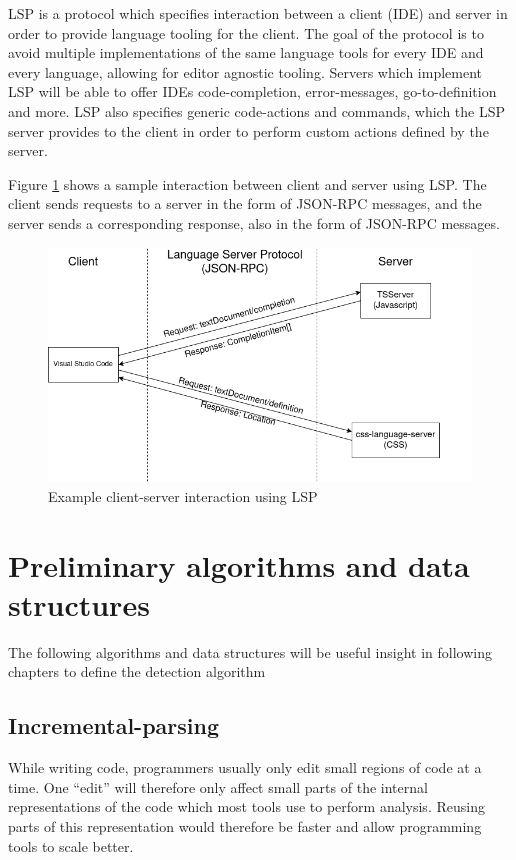 LSP is a protocol which specifies interaction between a client (IDE) and server in order
to provide language tooling for the client. The goal of the protocol is to avoid multiple
implementations of the same language tools for every IDE and every language, allowing for
editor agnostic tooling. Servers which implement LSP will be able to offer IDEs
code-completion, error-messages, go-to-definition and more. LSP also specifies generic
code-actions and commands, which the LSP server provides to the client in order to perform
custom actions defined by the server.

Figure \ref{fig:lspcommunication} shows a sample interaction between client and server
using LSP. The client sends requests to a server in the form of JSON-RPC messages, and the
server sends a corresponding response, also in the form of JSON-RPC messages.

\begin{figure}[t]
	\includegraphics[width=\textwidth]{images/lspcommunication.png}
	\caption{Example client-server interaction using LSP}
	\label{fig:lspcommunication}
\end{figure}

\section{Preliminary algorithms and data structures}
\label{prelimalgos}

The following algorithms and data structures will be useful insight in following chapters to
define the detection algorithm

\subsection*{Incremental-parsing}

While writing code, programmers usually only edit small regions of code at a time. One
``edit'' will therefore only affect small parts of the internal representations of the
code which most tools use to perform analysis. Reusing parts of this representation would
therefore be faster and allow programming tools to scale better. 

